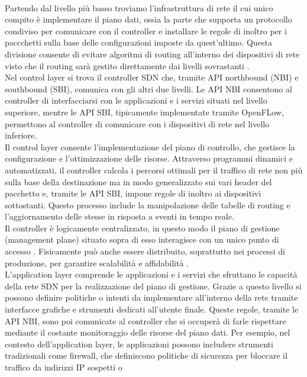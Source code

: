 \\Partendo dal livello più basso troviamo l'infrastruttura di rete il cui unico compito è implementare il piano dati, ossia la parte che supporta un protocollo condiviso per comunicare con il controller e installare le regole di inoltro
per i paccchetti sulla base delle configurazioni imposte da quest'ultimo. 
Questa divisione consente di evitare algoritmi
di routing all'interno dei dispositivi di rete visto che il routing sarà
gestito direttamente dai livelli sovrastanti \cite{tesiSDN:2017}. 
\\Nel control layer si trova il controller SDN che, tramite API northbound (NBI) e southbound (SBI), comunica con
gli altri due livelli. Le API NBI consentono al controller di interfacciarsi con le applicazioni e i servizi situati nel livello superiore,
mentre le API SBI, tipicamente implementate tramite OpenFLow, permettono al controller di comunicare con i dispositivi di rete nel livello inferiore.
\\Il control layer consente l'implementazione del piano di controllo, che gestisce la configurazione e l'ottimizzazione delle risorse. 
Attraverso programmi dinamici e automatizzati, il controller calcola i percorsi ottimali per il traffico di rete non più sulla base della destinazione ma in modo generalizzato sui vari header del pacchetto e, tramite le API SBI, impone regole di inoltro ai dispositivi sottostanti. 
Questo processo include la manipolazione delle tabelle di routing e l'aggiornamento delle stesse in risposta a eventi in tempo reale.
\\Il controller è logicamente centralizzato, in questo modo il piano di gestione (management plane) situato sopra di esso interagisce con un
unico punto di accesso \cite{tesiSDN:2020}. Fisicamente può anche essere distribuito, soprattutto nei processi di produzione, per garantire scalabilità e affidabilità \cite{sdnlayers}.
\\L'application layer comprende le applicazioni e i servizi che sfruttano le capacità della
rete SDN per la realizzazione del piano di gestione. Grazie a questo livello si possono
definire politiche o intenti da implementare all'interno della rete tramite interfacce grafiche e strumenti dedicati all'utente finale.
Queste regole, tramite le API NBI, sono poi comunicate al
controller che si occuperà di farle rispettare mediante il costante monitoraggio delle risorse del piano dati. 
Per esempio, nel contesto dell'application layer, le applicazioni possono includere strumenti tradizionali come firewall, che definiscono politiche di sicurezza per bloccare il traffico da indirizzi IP sospetti \cite{appl} o
